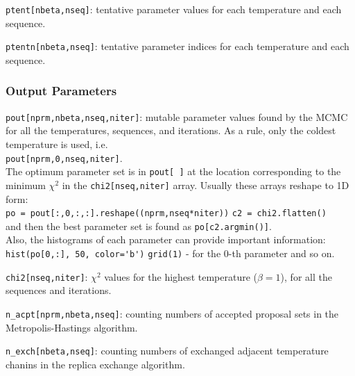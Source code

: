 \documentclass[preprint2]{aastex}
\begin{document}
\verb|ptent[nbeta,nseq]|: tentative parameter values for each temperature and each
                   sequence.

\verb|ptentn[nbeta,nseq]|: tentative parameter indices for each temperature and each
                    sequence.




\subsubsection{Output Parameters}

\verb|pout[nprm,nbeta,nseq,niter]|: mutable parameter values found by the MCMC for
                             all the temperatures, sequences, and iterations.
                             As a rule, only the coldest temperature is used,
                             i.e. \\
                             \verb|pout[nprm,0,nseq,niter]|. \\
                             The optimum parameter set is in \verb|pout[ ]| at the
                             location corresponding to the minimum $\chi^2$
                             in the \verb|chi2[nseq,niter]| array. Usually these
                             arrays reshape to 1D form:\\ 
                             \verb|po = pout[:,0,:,:].reshape((nprm,nseq*niter))|
                             \verb|c2 = chi2.flatten()| \\
                             and then the best parameter set is found as
                             \verb|po[c2.argmin()]|. \\
                             Also, the histograms of each
                             parameter can provide important information: \\
                             \verb|hist(po[0,:], 50, color='b')|
                             \verb|grid(1)| - for the 0-th parameter and so on.

\verb|chi2[nseq,niter]|: $\chi^2$ values for the highest temperature ($\beta=1$), 
                         for all the sequences and iterations.

\verb|n_acpt[nprm,nbeta,nseq]|: counting numbers of accepted proposal sets in the
                         Metropolis-Hastings algorithm.

\verb|n_exch[nbeta,nseq]|: counting numbers of exchanged adjacent temperature
                    chanins in the replica exchange algorithm.
\end{document}
